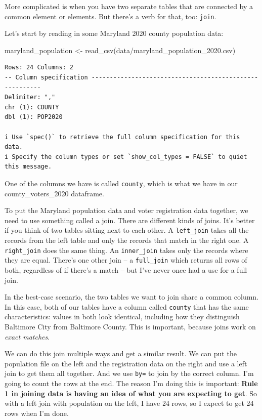\documentclass[
  letterpaper,
  DIV=11,
  numbers=noendperiod]{scrreprt}
\newenvironment{Shaded}{\begin{snugshade}}{\end{snugshade}}
\newcommand{\FunctionTok}[1]{\textcolor[rgb]{0.28,0.35,0.67}{#1}}
\newcommand{\NormalTok}[1]{\textcolor[rgb]{0.00,0.23,0.31}{#1}}
\newcommand{\OtherTok}[1]{\textcolor[rgb]{0.00,0.23,0.31}{#1}}
\newcommand{\StringTok}[1]{\textcolor[rgb]{0.13,0.47,0.30}{#1}}
\begin{document}
More complicated is when you have two separate tables that are connected
by a common element or elements. But there's a verb for that, too:
\texttt{join}.

Let's start by reading in some Maryland 2020 county population data:

\begin{Shaded}
\begin{Highlighting}[]
\NormalTok{maryland\_population }\OtherTok{\textless{}{-}} \FunctionTok{read\_csv}\NormalTok{(}\StringTok{\textquotesingle{}data/maryland\_population\_2020.csv\textquotesingle{}}\NormalTok{)}
\end{Highlighting}
\end{Shaded}

\begin{verbatim}
Rows: 24 Columns: 2
-- Column specification --------------------------------------------------------
Delimiter: ","
chr (1): COUNTY
dbl (1): POP2020

i Use `spec()` to retrieve the full column specification for this data.
i Specify the column types or set `show_col_types = FALSE` to quiet this message.
\end{verbatim}

One of the columns we have is called \texttt{county}, which is what we
have in our county\_voters\_2020 dataframe.

To put the Maryland population data and voter registration data
together, we need to use something called a join. There are different
kinds of joins. It's better if you think of two tables sitting next to
each other. A \texttt{left\_join} takes all the records from the left
table and only the records that match in the right one. A
\texttt{right\_join} does the same thing. An \texttt{inner\_join} takes
only the records where they are equal. There's one other join -- a
\texttt{full\_join} which returns all rows of both, regardless of if
there's a match -- but I've never once had a use for a full join.

In the best-case scenario, the two tables we want to join share a common
column. In this case, both of our tables have a column called
\texttt{county} that has the same characteristics: values in both look
identical, including how they distinguish Baltimore City from Baltimore
County. This is important, because joins work on \emph{exact matches}.

We can do this join multiple ways and get a similar result. We can put
the population file on the left and the registration data on the right
and use a left join to get them all together. And we use \texttt{by=} to
join by the correct column. I'm going to count the rows at the end. The
reason I'm doing this is important: \textbf{Rule 1 in joining data is
having an idea of what you are expecting to get}. So with a left join
with population on the left, I have 24 rows, so I expect to get 24 rows
when I'm done.
\end{document}
